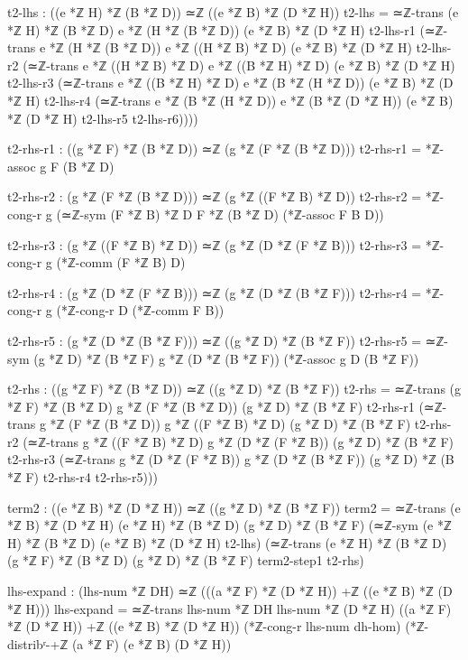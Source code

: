 \documentclass[11pt,a4paper]{book}
\begin{document}
\begin{code}
    t2-lhs : ((e *ℤ H) *ℤ (B *ℤ D)) ≃ℤ ((e *ℤ B) *ℤ (D *ℤ H))
    t2-lhs = ≃ℤ-trans {(e *ℤ H) *ℤ (B *ℤ D)} {e *ℤ (H *ℤ (B *ℤ D))} {(e *ℤ B) *ℤ (D *ℤ H)} t2-lhs-r1
             (≃ℤ-trans {e *ℤ (H *ℤ (B *ℤ D))} {e *ℤ ((H *ℤ B) *ℤ D)} {(e *ℤ B) *ℤ (D *ℤ H)} t2-lhs-r2
             (≃ℤ-trans {e *ℤ ((H *ℤ B) *ℤ D)} {e *ℤ ((B *ℤ H) *ℤ D)} {(e *ℤ B) *ℤ (D *ℤ H)} t2-lhs-r3
             (≃ℤ-trans {e *ℤ ((B *ℤ H) *ℤ D)} {e *ℤ (B *ℤ (H *ℤ D))} {(e *ℤ B) *ℤ (D *ℤ H)} t2-lhs-r4
             (≃ℤ-trans {e *ℤ (B *ℤ (H *ℤ D))} {e *ℤ (B *ℤ (D *ℤ H))} {(e *ℤ B) *ℤ (D *ℤ H)} t2-lhs-r5 t2-lhs-r6))))
    
    t2-rhs-r1 : ((g *ℤ F) *ℤ (B *ℤ D)) ≃ℤ (g *ℤ (F *ℤ (B *ℤ D)))
    t2-rhs-r1 = *ℤ-assoc g F (B *ℤ D)
    
    t2-rhs-r2 : (g *ℤ (F *ℤ (B *ℤ D))) ≃ℤ (g *ℤ ((F *ℤ B) *ℤ D))
    t2-rhs-r2 = *ℤ-cong-r g (≃ℤ-sym {(F *ℤ B) *ℤ D} {F *ℤ (B *ℤ D)} (*ℤ-assoc F B D))
    
    t2-rhs-r3 : (g *ℤ ((F *ℤ B) *ℤ D)) ≃ℤ (g *ℤ (D *ℤ (F *ℤ B)))
    t2-rhs-r3 = *ℤ-cong-r g (*ℤ-comm (F *ℤ B) D)
    
    t2-rhs-r4 : (g *ℤ (D *ℤ (F *ℤ B))) ≃ℤ (g *ℤ (D *ℤ (B *ℤ F)))
    t2-rhs-r4 = *ℤ-cong-r g (*ℤ-cong-r D (*ℤ-comm F B))
    
    t2-rhs-r5 : (g *ℤ (D *ℤ (B *ℤ F))) ≃ℤ ((g *ℤ D) *ℤ (B *ℤ F))
    t2-rhs-r5 = ≃ℤ-sym {(g *ℤ D) *ℤ (B *ℤ F)} {g *ℤ (D *ℤ (B *ℤ F))} (*ℤ-assoc g D (B *ℤ F))
    
    t2-rhs : ((g *ℤ F) *ℤ (B *ℤ D)) ≃ℤ ((g *ℤ D) *ℤ (B *ℤ F))
    t2-rhs = ≃ℤ-trans {(g *ℤ F) *ℤ (B *ℤ D)} {g *ℤ (F *ℤ (B *ℤ D))} {(g *ℤ D) *ℤ (B *ℤ F)} t2-rhs-r1
             (≃ℤ-trans {g *ℤ (F *ℤ (B *ℤ D))} {g *ℤ ((F *ℤ B) *ℤ D)} {(g *ℤ D) *ℤ (B *ℤ F)} t2-rhs-r2
             (≃ℤ-trans {g *ℤ ((F *ℤ B) *ℤ D)} {g *ℤ (D *ℤ (F *ℤ B))} {(g *ℤ D) *ℤ (B *ℤ F)} t2-rhs-r3
             (≃ℤ-trans {g *ℤ (D *ℤ (F *ℤ B))} {g *ℤ (D *ℤ (B *ℤ F))} {(g *ℤ D) *ℤ (B *ℤ F)} t2-rhs-r4 t2-rhs-r5)))

    term2 : ((e *ℤ B) *ℤ (D *ℤ H)) ≃ℤ ((g *ℤ D) *ℤ (B *ℤ F))
    term2 = ≃ℤ-trans {(e *ℤ B) *ℤ (D *ℤ H)} {(e *ℤ H) *ℤ (B *ℤ D)} {(g *ℤ D) *ℤ (B *ℤ F)}
              (≃ℤ-sym {(e *ℤ H) *ℤ (B *ℤ D)} {(e *ℤ B) *ℤ (D *ℤ H)} t2-lhs)
              (≃ℤ-trans {(e *ℤ H) *ℤ (B *ℤ D)} {(g *ℤ F) *ℤ (B *ℤ D)} {(g *ℤ D) *ℤ (B *ℤ F)} term2-step1 t2-rhs)

    lhs-expand : (lhs-num *ℤ DH) ≃ℤ (((a *ℤ F) *ℤ (D *ℤ H)) +ℤ ((e *ℤ B) *ℤ (D *ℤ H)))
    lhs-expand = ≃ℤ-trans {lhs-num *ℤ DH} {lhs-num *ℤ (D *ℤ H)} 
                  {((a *ℤ F) *ℤ (D *ℤ H)) +ℤ ((e *ℤ B) *ℤ (D *ℤ H))}
                  (*ℤ-cong-r lhs-num dh-hom)
                  (*ℤ-distribʳ-+ℤ (a *ℤ F) (e *ℤ B) (D *ℤ H))


\end{code}
\end{document}
